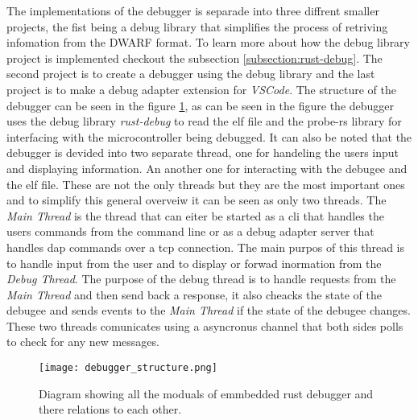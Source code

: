  

The implementations of the debugger is separade into three diffrent smaller projects, the fist being a debug library that simplifies the process of retriving infomation from the \gls{DWARF} format.
To learn more about how the debug library project is implemented checkout the subsection \ref{subsection:rust-debug}.
The second project is to create a debugger using the debug library and the last project is to make a debug adapter extension for \emph{VSCode}.
The structure of the debugger can be seen in the figure \ref{fig:EDBStruct}, as can be seen in the figure the debugger uses the debug library \emph{rust-debug} to read the \gls{elf} file and the probe-rs library for interfacing with the microcontroller being debugged.
It can also be noted that the debugger is devided into two separate thread, one for handeling the users input and displaying information.
An another one for interacting with the \gls{debugee} and the \gls{elf} file.
These are not the only threads but they are the most important ones and to simplify this general overveiw it can be seen as only two threads.
The \emph{Main Thread} is the thread that can eiter be started as a \gls{cli} that handles the users commands from the command line or as a debug adapter server that handles \acrshort{dap} commands over a \gls{tcp} connection.
The main purpos of this thread is to handle input from the user and to display or forwad inormation from the \emph{Debug Thread}.
The purpose of the debug thread is to handle requests from the \emph{Main Thread} and then send back a response, it also cheacks the state of the \gls{debugee} and sends events to the \emph{Main Thread} if the state of the debugee changes.
These two threads comunicates using a asyncronus channel that both sides polls to check for any new messages.


\begin{figure}[h]
	\centering
	\texttt{[image: debugger\_structure.png]}
	\caption{Diagram showing all the moduals of emmbedded rust debugger and there relations to each other.}
	\label{fig:EDBStruct}
\end{figure}


